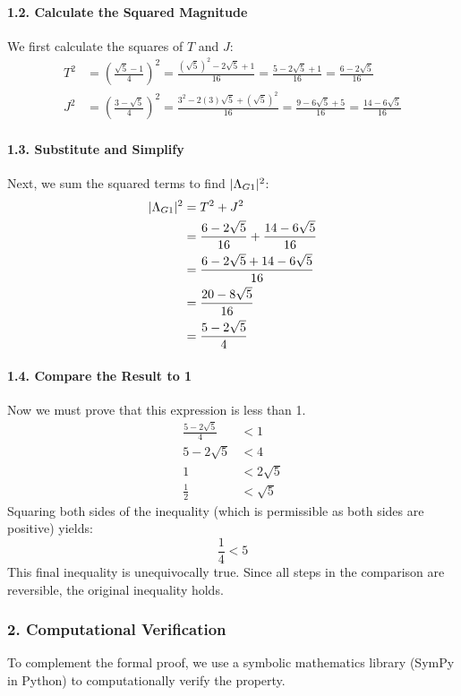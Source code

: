 \paragraph{1.2. Calculate the Squared Magnitude}
We first calculate the squares of $T$ and $J$:
\begin{align*}
T^2 &= \left(\frac{\sqrt{5}-1}{4}\right)^2 = \frac{(\sqrt{5})^2 - 2\sqrt{5} + 1}{16} = \frac{5 - 2\sqrt{5} + 1}{16} = \frac{6 - 2\sqrt{5}}{16} \\
J^2 &= \left(\frac{3-\sqrt{5}}{4}\right)^2 = \frac{3^2 - 2(3)\sqrt{5} + (\sqrt{5})^2}{16} = \frac{9 - 6\sqrt{5} + 5}{16} = \frac{14 - 6\sqrt{5}}{16}
\end{align*}

\paragraph{1.3. Substitute and Simplify}
Next, we sum the squared terms to find $|\Lambda_{G1}|^2$:
\begin{align*}
|\Lambda_{G1}|^2 &= T^2 + J^2 \\
&= \frac{6 - 2\sqrt{5}}{16} + \frac{14 - 6\sqrt{5}}{16} \\
&= \frac{6 - 2\sqrt{5} + 14 - 6\sqrt{5}}{16} \\
&= \frac{20 - 8\sqrt{5}}{16} \\
&= \frac{5 - 2\sqrt{5}}{4}
\end{align*}

\paragraph{1.4. Compare the Result to 1}
Now we must prove that this expression is less than 1.
\begin{align*}
\frac{5 - 2\sqrt{5}}{4} &< 1 \\
5 - 2\sqrt{5} &< 4 \\
1 &< 2\sqrt{5} \\
\frac{1}{2} &< \sqrt{5}
\end{align*}
Squaring both sides of the inequality (which is permissible as both sides are positive) yields:
$$ \frac{1}{4} < 5 $$
This final inequality is unequivocally true. Since all steps in the comparison are reversible, the original inequality holds.

\subsubsection*{2. Computational Verification}
To complement the formal proof, we use a symbolic mathematics library (SymPy in Python) to computationally verify the property.

